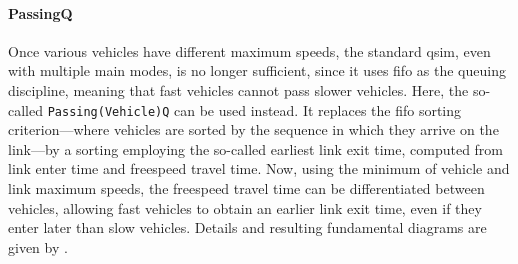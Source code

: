 


\paragraph{PassingQ} 

Once various vehicles have different maximum speeds, the standard \gls{qsim}, even with multiple main modes, is no longer sufficient, since it uses \gls{fifo} as the queuing discipline, meaning that fast vehicles cannot pass slower vehicles. Here, the so-called \lstinline|Passing(Vehicle)Q| can be used instead.  It replaces the \gls{fifo} sorting criterion---where vehicles are sorted by the sequence in which they arrive on the link---by a sorting employing the so-called earliest link exit time, computed from link enter time and freespeed travel time.  Now, using the minimum of vehicle and link maximum speeds, the freespeed travel time can be differentiated between vehicles, allowing fast vehicles to obtain an earlier link exit time, even if they enter later than slow vehicles.  Details and resulting fundamental diagrams are given by \citet{AgarwalEtcMixedTraffic}.

